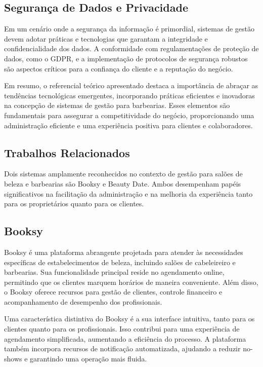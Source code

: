 \documentclass[12pt]{article}
\begin{document}
\subsection{Segurança de Dados e Privacidade}

Em um cenário onde a segurança da informação é primordial, sistemas de gestão devem adotar práticas e tecnologias que garantam a integridade e confidencialidade dos dados. A conformidade com regulamentações de proteção de dados, como o GDPR, e a implementação de protocolos de segurança robustos são aspectos críticos para a confiança do cliente e a reputação do negócio.

Em resumo, o referencial teórico apresentado destaca a importância de abraçar as tendências tecnológicas emergentes, incorporando práticas eficientes e inovadoras na concepção de sistemas de gestão para barbearias. Esses elementos são fundamentais para assegurar a competitividade do negócio, proporcionando uma administração eficiente e uma experiência positiva para clientes e colaboradores.

\subsection{Trabalhos Relacionados}

Dois sistemas amplamente reconhecidos no contexto de gestão para salões de beleza e barbearias são Booksy e Beauty Date. Ambos desempenham papéis significativos na facilitação da administração e na melhoria da experiência tanto para os proprietários quanto para os clientes.

\subsection{Booksy}

Booksy é uma plataforma abrangente projetada para atender às necessidades específicas de estabelecimentos de beleza, incluindo salões de cabeleireiro e barbearias. Sua funcionalidade principal reside no agendamento online, permitindo que os clientes marquem horários de maneira conveniente. Além disso, o Booksy oferece recursos para gestão de clientes, controle financeiro e acompanhamento de desempenho dos profissionais.

Uma característica distintiva do Booksy é a sua interface intuitiva, tanto para os clientes quanto para os profissionais. Isso contribui para uma experiência de agendamento simplificada, aumentando a eficiência do processo. A plataforma também incorpora recursos de notificação automatizada, ajudando a reduzir no-shows e garantindo uma operação mais fluida.
\end{document}
